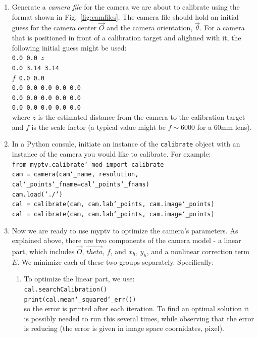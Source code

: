 \documentclass[10pt,a4paper]{article}
\begin{document}
\begin{enumerate}
	\item Generate a \textit{camera file} for the camera we are about to calibrate using the format shown in Fig.~\ref{fig:camfiles}. The camera file should hold an initial guess for the camera center $\vec{O}$ and the camera orientation, $\vec{\theta}$. For a camera that is positioned in front of a calibration target and alighned with it, the following initial guess might be used:\\[.5em]
	\texttt{0.0 0.0 $z$\\
	0.0 3.14 3.14\\
	$f$
	0.0 0.0\\
	0.0 0.0 0.0 0.0 0.0\\
	0.0 0.0 0.0 0.0 0.0\\
	0.0 0.0 0.0 0.0 0.0}\\[.5em]
	where $z$ is the estimated distance from the camera to the calibration target and $f$ is the scale factor (a typical value might be $f\sim6000$ for a 60mm lens).
	
	\item In a Python consule, initiate an instance of the \texttt{calibrate} object with an instance of the camera you would like to calibrate. For example:\\[.5em]
	\texttt{from myptv.calibrate\char`_mod import calibrate}\\
	\texttt{cam = camera(cam\char`_name, resolution, cal\char`_points\char`_fname=cal\char`_points\char`_fnams)}\\
	\texttt{cam.load('./')}\\
	\texttt{cal = calibrate(cam, cam.lab\char`_points, cam.image\char`_points)}\\
	\texttt{cal = calibrate(cam, cam.lab\char`_points, cam.image\char`_points)}
	
	\item Now we are ready to use myptv to optimize the camera's parameters. As explained above, there are two components of the camera model - a linear part, which includes $\vec{O}$, $\vec{theta}$, $f$, and $x_h, \, y_h$, and a nonlinear correction term $E$. We minimize each of these two groups separately. Specifically: 
	\begin{enumerate}
		\item To optimize the linear part, we use:\\[.5em]
		\texttt{cal.searchCalibration()}\\
		\texttt{print(cal.mean\char`_squared\char`_err())}\\[.5em]
		so the error is printed after each iteration. To find an optimal solution it is possibly needed to run this several times, while observing that the error is reducing (the error is given in image space coornidates, pixel).
		

\end{enumerate}
\end{enumerate}
\end{document}
